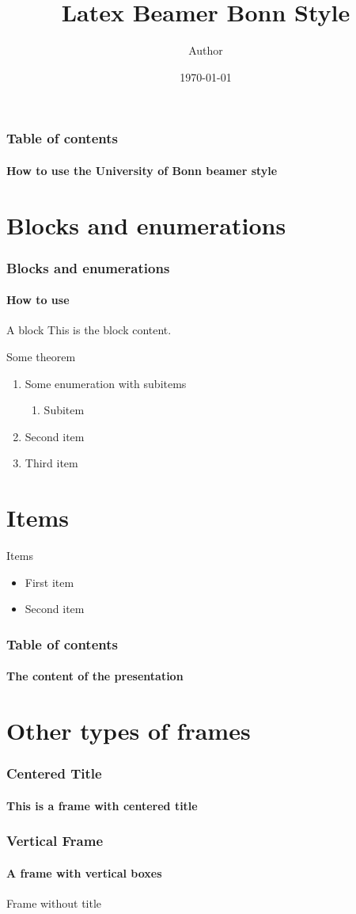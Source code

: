 \documentclass[aspectratio=1610]{beamer}
\title{Latex Beamer Bonn Style}
\date{\today}
\author{Author}
\begin{document}
	\begin{frame}[plain]
	\titlepage
\end{frame}

\begin{framecontent}
	\frametitle{Table of contents}
	\framesubtitle{How to use the University of Bonn beamer style}
\end{framecontent}



\section{Blocks and enumerations}
\begin{frame}
\frametitle{Blocks and enumerations}
\framesubtitle{How to use}
\begin{block}{A block}
	This is the block content.
\end{block}
\begin{theorem}
	Some theorem \end{theorem}
\begin{enumerate}
	\item<1-| alert@1> Some enumeration with subitems
	\begin{enumerate}
		\item Subitem
	\end{enumerate}
	\item<2-> Second item
	\item<3-> Third item
\end{enumerate}
\end{frame}

\section{Items}
\begin{frame}{Items}
\begin{itemize}
\item First item
\item Second item
\end{itemize}
\end{frame}

\begin{frameverticalcontent}
	\frametitle{Table of contents}
	\framesubtitle{The content of the presentation}
\end{frameverticalcontent}

\section{Other types of frames}

\begin{framecenter}
	\frametitle{Centered Title}
	\framesubtitle{This is a frame with centered title}
\end{framecenter}

\begin{framevertical}
	\frametitle{Vertical Frame}
	\framesubtitle{A frame with vertical boxes}
\end{framevertical}





\begin{frameblank}
	Frame without title
\end{frameblank}
\end{document}
